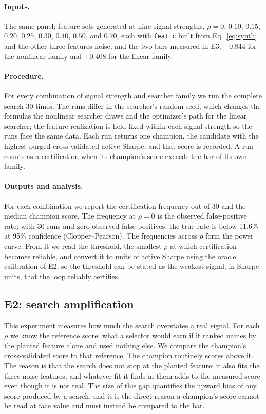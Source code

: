 \documentclass[11pt]{article}
\newcommand{\code}[1]{\texttt{#1}}
\begin{document}
\paragraph{Inputs.} The same panel; feature sets generated at nine signal strengths, $\rho = 0$,
$0.10$, $0.15$, $0.20$, $0.25$, $0.30$, $0.40$, $0.50$, and $0.70$, each with \code{feat\_c} built from
Eq.~\eqref{eq:synth} and the other three features noise; and the two bars measured in E3, $+0.844$ for
the nonlinear family and $+0.408$ for the linear family.

\paragraph{Procedure.} For every combination of signal strength and searcher family we run the complete
search 30 times. The runs differ in the searcher's random seed, which changes the formulas the nonlinear
searcher draws and the optimizer's path for the linear searcher; the feature realization is held fixed
within each signal strength so the runs face the same data. Each run returns one champion, the candidate
with the highest purged cross-validated active Sharpe, and that score is recorded. A run counts as a
certification when its champion's score exceeds the bar of its own family.

\paragraph{Outputs and analysis.} For each combination we report the certification frequency out of 30
and the median champion score. The frequency at $\rho=0$ is the observed false-positive rate; with 30
runs and zero observed false positives, the true rate is below 11.6\% at 95\% confidence
(Clopper--Pearson). The frequencies across $\rho$ form the power curve. From it we read the threshold,
the smallest $\rho$ at which certification becomes reliable, and convert it to units of active Sharpe
using the oracle calibration of E2, so the threshold can be stated as the weakest signal, in Sharpe
units, that the loop reliably certifies.

\subsection{E2: search amplification}

This experiment measures how much the search overstates a real
signal. For each $\rho$ we know the reference score: what a selector would earn if it ranked names by the
planted feature alone and used nothing else. We compare the champion's cross-validated score to that
reference. The champion routinely scores above it. The reason is that the search does not stop at the
planted feature; it also fits the three noise features, and whatever fit it finds in them adds to the
measured score even though it is not real. The size of this gap quantifies the upward bias of any score
produced by a search, and it is the direct reason a champion's score cannot be read at face value and
must instead be compared to the bar.
\end{document}
